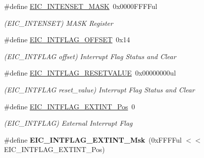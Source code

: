 \begin{DoxyCompactItemize}
\item 
\hypertarget{group___s_a_m_l21___e_i_c_ga518b934f1f683eea112f810134e11386}{}\#define \hyperlink{group___s_a_m_l21___e_i_c_ga518b934f1f683eea112f810134e11386}{E\+I\+C\+\_\+\+I\+N\+T\+E\+N\+S\+E\+T\+\_\+\+M\+A\+S\+K}~0x0000\+F\+F\+F\+Ful\label{group___s_a_m_l21___e_i_c_ga518b934f1f683eea112f810134e11386}

\begin{DoxyCompactList}\small\item\em (E\+I\+C\+\_\+\+I\+N\+T\+E\+N\+S\+E\+T) M\+A\+S\+K Register \end{DoxyCompactList}\item 
\hypertarget{group___s_a_m_l21___e_i_c_ga4e51877a81710951770d2bd40145d6b7}{}\#define \hyperlink{group___s_a_m_l21___e_i_c_ga4e51877a81710951770d2bd40145d6b7}{E\+I\+C\+\_\+\+I\+N\+T\+F\+L\+A\+G\+\_\+\+O\+F\+F\+S\+E\+T}~0x14\label{group___s_a_m_l21___e_i_c_ga4e51877a81710951770d2bd40145d6b7}

\begin{DoxyCompactList}\small\item\em (E\+I\+C\+\_\+\+I\+N\+T\+F\+L\+A\+G offset) Interrupt Flag Status and Clear \end{DoxyCompactList}\item 
\hypertarget{group___s_a_m_l21___e_i_c_ga4672c235b09428fde9c98d6d844c09d9}{}\#define \hyperlink{group___s_a_m_l21___e_i_c_ga4672c235b09428fde9c98d6d844c09d9}{E\+I\+C\+\_\+\+I\+N\+T\+F\+L\+A\+G\+\_\+\+R\+E\+S\+E\+T\+V\+A\+L\+U\+E}~0x00000000ul\label{group___s_a_m_l21___e_i_c_ga4672c235b09428fde9c98d6d844c09d9}

\begin{DoxyCompactList}\small\item\em (E\+I\+C\+\_\+\+I\+N\+T\+F\+L\+A\+G reset\+\_\+value) Interrupt Flag Status and Clear \end{DoxyCompactList}\item 
\hypertarget{group___s_a_m_l21___e_i_c_gadcbc791cf87b0cbd60e76f1958249501}{}\#define \hyperlink{group___s_a_m_l21___e_i_c_gadcbc791cf87b0cbd60e76f1958249501}{E\+I\+C\+\_\+\+I\+N\+T\+F\+L\+A\+G\+\_\+\+E\+X\+T\+I\+N\+T\+\_\+\+Pos}~0\label{group___s_a_m_l21___e_i_c_gadcbc791cf87b0cbd60e76f1958249501}

\begin{DoxyCompactList}\small\item\em (E\+I\+C\+\_\+\+I\+N\+T\+F\+L\+A\+G) External Interrupt Flag \end{DoxyCompactList}\item 
\hypertarget{group___s_a_m_l21___e_i_c_gae66d3b315a5d706346ec79d4e8348b2e}{}\#define {\bfseries E\+I\+C\+\_\+\+I\+N\+T\+F\+L\+A\+G\+\_\+\+E\+X\+T\+I\+N\+T\+\_\+\+Msk}~(0x\+F\+F\+F\+Ful $<$$<$ E\+I\+C\+\_\+\+I\+N\+T\+F\+L\+A\+G\+\_\+\+E\+X\+T\+I\+N\+T\+\_\+\+Pos)\label{group___s_a_m_l21___e_i_c_gae66d3b315a5d706346ec79d4e8348b2e}


\end{DoxyCompactItemize}
